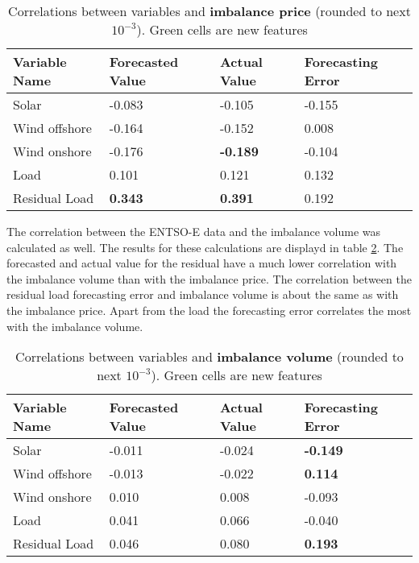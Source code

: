 \documentclass[class=scrbook, crop=false]{standalone}
\begin{document}
    \begin{table}
    \centering
    \begin{tabular}{l|l|l|l}
    Variable Name	&Forecasted Value& Actual Value	& Forecasting Error \\\hline
    Solar 		& -0.083		& -0.105		& \cellcolor{green} -0.155 \\
    Wind offshore 	& -0.164		& -0.152		& \cellcolor{green} 0.008 \\
    Wind onshore 	& -0.176		& \textbf{-0.189}	& \cellcolor{green} -0.104 \\
    Load 		&0.101		& 0.121		& \cellcolor{green}  0.132 \\
    Residual Load 	& \cellcolor{green} \textbf{0.343}& \cellcolor{green} \textbf{0.391}& \cellcolor{green}0.192\\
    \end{tabular}

    
    \caption{Correlations between variables and \textbf{imbalance price} (rounded to next $10^{-3}$). Green cells are new features}
    \label{Table::Rebap_Correlations_ENTSOE}
    \end{table}

The correlation between the ENTSO-E data and the imbalance volume was calculated as well.
The results for these calculations are displayd in table \ref{Table::Imbalance_volume_Correlations_ENTSOE}. The forecasted and actual value for the residual have a much lower correlation with the imbalance volume than with the imbalance price. The correlation between the residual load forecasting error and imbalance volume is about the same as with the imbalance price. Apart from the load the forecasting error correlates the most with the imbalance volume. 



    \begin{table}
    \centering
    \begin{tabular}{l|l|l|l}
    Variable Name	&Forecasted Value& Actual Value	& Forecasting Error \\\hline
    Solar 		&  -0.011		& -0.024		& \cellcolor{green} \textbf{-0.149} \\
    Wind offshore 	& -0.013		&  -0.022		& \cellcolor{green}\textbf{0.114}\\
    Wind onshore 	& 0.010		& 0.008		& \cellcolor{green} -0.093\\
    Load 		& 0.041		& 0.066		& \cellcolor{green}  -0.040 \\
    Residual Load 	& \cellcolor{green} 0.046& \cellcolor{green} 0.080& \cellcolor{green} \textbf{0.193}\\
    \end{tabular}

    
    \caption{Correlations between variables and \textbf{imbalance volume} (rounded to next $10^{-3}$). Green cells are new features}
    \label{Table::Imbalance_volume_Correlations_ENTSOE}
    \end{table}
    
\end{document}
